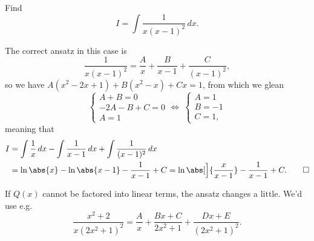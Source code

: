 \begin{example}
	Find
	\[
		I = \int \frac{1}{x (x - 1)^2} \, d x.
	\]

	\noindent
	The correct ansatz in this case is
	\[
		\frac{1}{x (x - 1)^2} = \frac{A}{x} + \frac{B}{x - 1} + \frac{C}{(x - 1)^2},
	\]
	so we have $A(x^2 - 2 x + 1) + B(x^2 - x) + C x = 1$, from which we glean
	\[
		\begin{cases}
			A + B = 0 \\
			-2 A - B + C = 0 \\
			A = 1
		\end{cases} \Longleftrightarrow~
		\begin{cases}
			A = 1 \\
			B = -1 \\
			C = 1,
		\end{cases}
	\]
	meaning that
	\begin{align*}
		I &= \int \frac{1}{x} \, d x - \int \frac{1}{x - 1} \, d x + \int \frac{1}{(x - 1)^2} \, d x \\
		  &= \ln\abs{x} - \ln\abs{x - 1} - \frac{1}{x - 1} + C = \ln\abs[\Big]{\frac{x}{x - 1}} - \frac{1}{x - 1} + C. \qedhere
	\end{align*}
\end{example}


\noindent
If $Q(x)$ cannot be factored into linear terms, the ansatz changes a little.
We'd use e.g.
\[
	\frac{x^2 + 2}{x (2 x^2 + 1)^2} = \frac{A}{x} + \frac{B x + C}{2 x^2 + 1} + \frac{D x + E}{(2 x^2 + 1)^2}.
\]
